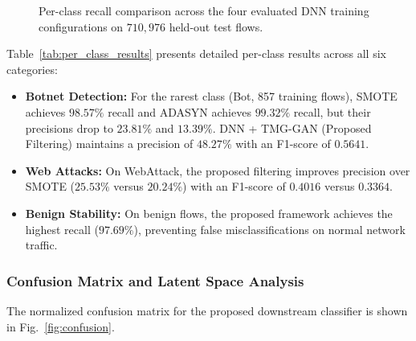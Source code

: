 \documentclass[conference]{IEEEtran}
\begin{document}
\begin{figure}[t]
\caption{Per-class recall comparison across the four evaluated DNN training configurations on $710{,}976$ held-out test flows.}
\label{fig:recall_by_class}
\end{figure}

Table~\ref{tab:per_class_results} presents detailed per-class results across all six categories:
\begin{itemize}\setlength{\itemsep}{2pt}\setlength{\topsep}{2pt}\setlength{\parsep}{0pt}
    \item \textbf{Botnet Detection:} For the rarest class (Bot, 857 training flows), SMOTE achieves $98.57\%$ recall and ADASYN achieves $99.32\%$ recall, but their precisions drop to $23.81\%$ and $13.39\%$. DNN + TMG-GAN (Proposed Filtering) maintains a precision of $\mathbf{48.27\%}$ with an F1-score of $\mathbf{0.5641}$.
    \item \textbf{Web Attacks:} On WebAttack, the proposed filtering improves precision over SMOTE ($25.53\%$ versus $20.24\%$) with an F1-score of $0.4016$ versus $0.3364$.
    \item \textbf{Benign Stability:} On benign flows, the proposed framework achieves the highest recall ($97.69\%$), preventing false misclassifications on normal network traffic.
\end{itemize}

\subsubsection{Confusion Matrix and Latent Space Analysis}

The normalized confusion matrix for the proposed downstream classifier is shown in Fig.~\ref{fig:confusion}.
\end{document}
